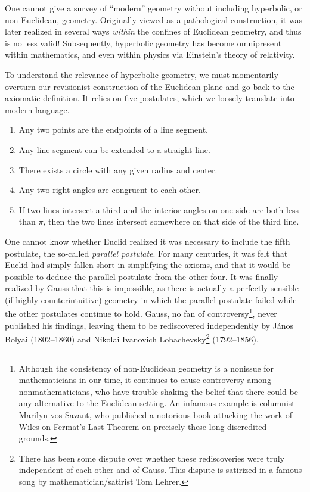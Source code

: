 \documentclass[12pt]{book}
\numberwithin{exc}{section}
\numberwithin{figure}{section}
\numberwithin{equation}{theorem}
\begin{document}
One cannot give a survey of ``modern'' geometry without including
hyperbolic, or non-Euclidean, geometry. Originally viewed as a
pathological construction, it was later realized in several ways \emph{within}
the confines of Euclidean geometry, and thus is no less valid! Subsequently,
hyperbolic geometry has become omnipresent within mathematics, and even
within physics via Einstein's  theory of relativity.

To understand the relevance of hyperbolic geometry, we must momentarily
overturn
our revisionist construction of the Euclidean plane and go back to the
axiomatic definition. It relies on five postulates, which we loosely
translate into modern language.
\begin{enumerate}
\item
Any two points are the endpoints of a line segment.
\item
Any line segment can be extended to a straight line.
\item
There exists a circle with any given radius and center.
\item
Any two right angles are congruent to each other.
\item
If two lines intersect a third and the interior angles on one side are
both less than $\pi$, then the two lines intersect somewhere on that side
of the third line.
\end{enumerate}

One cannot know whether Euclid realized it was necessary to include the
fifth postulate, the so-called \emph{parallel postulate}.
 For many centuries, it was felt that
Euclid had simply fallen short in simplifying the axioms, and that it
would be possible to deduce the parallel postulate from the other four.
It was finally realized by Gauss 
that this is impossible, as there is
actually a perfectly sensible (if highly counterintuitive)
geometry in which the parallel postulate
failed while the other postulates continue to hold. 
Gauss, no fan of controversy\footnote{Although
the consistency of non-Euclidean geometry is a nonissue for mathematicians
in our time,
it continues to cause controversy among nonmathematicians, who have trouble
shaking the belief that there could be any alternative to the Euclidean
setting. An infamous example is columnist Marilyn vos Savant, 
 who published
a notorious book attacking the work of Wiles on Fermat's Last Theorem
on precisely these long-discredited grounds.},
never published his findings, leaving
them to be rediscovered independently by J\'anos Bolyai (1802--1860)
and Nikolai Ivanovich Lobachevsky\footnote{There has been some dispute
over whether these rediscoveries were truly independent of each other
and of Gauss. This dispute is satirized in a famous
song by mathematician/satirist Tom Lehrer. }
 (1792--1856). 
\end{document}
